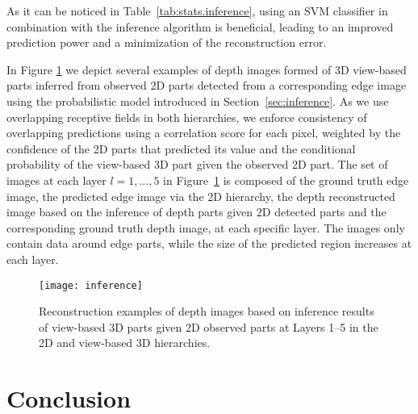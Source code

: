 \documentclass[conference]{IEEEtran}
\begin{document}
As it can be noticed in Table~\ref{tab:stats.inference}, using an SVM classifier in combination with the inference algorithm is beneficial, leading to an improved prediction power and a minimization of the reconstruction error.

In Figure \ref{inference} we depict several examples of depth images formed of 3D view-based parts inferred from observed 2D parts detected from a corresponding edge image using the probabilistic model introduced in Section~\ref{sec:inference}. As we use overlapping receptive fields in both hierarchies, we enforce consistency of overlapping predictions using a correlation score for each pixel, weighted by the confidence of the 2D parts that predicted its value and the conditional probability of the view-based 3D part given the observed 2D part. The set of images at each layer $l=1,\ldots,5$ in Figure~\ref{inference} is composed of the ground truth edge image, the predicted edge image via the 2D hierarchy, the depth reconstructed image based on the inference of depth parts given 2D detected parts and the corresponding ground truth depth image, at each specific layer. The images only contain data around edge parts, while the size of the predicted region increases at each layer.

\begin{figure}
\begin{center}
\texttt{[image: inference]}
\end{center}
\caption{Reconstruction examples of depth images based on inference results of view-based 3D parts given 2D observed parts at Layers 1--5 in the 2D and view-based 3D hierarchies.}
\label{inference}
\end{figure}

\section{Conclusion}
\label{sec:conclusions}
\end{document}
